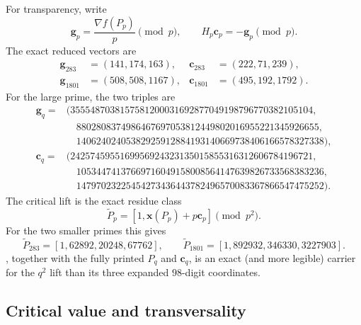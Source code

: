 For transparency, write
\[
 \mathbf g_p=\frac{\nabla f(P_p)}p\pmod p,\qquad
 H_p\mathbf c_p=-\mathbf g_p\pmod p.
\]
The exact reduced vectors are
\begin{align*}
\mathbf g_{283}&=(141,174,163),&
\mathbf c_{283}&=(222,71,239),\\
\mathbf g_{1801}&=(508,508,1167),&
\mathbf c_{1801}&=(495,192,1792).
\end{align*}
For the large prime, the two triples are
\begin{align*}
\mathbf g_q={}&\bigl(
3555487038157581200031692877049198796770382105104,\\[-2pt]
&\quad 8802808374986467697053812449802016955221345926655,\\[-2pt]
&\quad 14062402405382925912884193140669738406166578327338\bigr),\\
\mathbf c_q={}&\bigl(
2425745955169956924323135015855316312606784196721,\\[-2pt]
&\quad 10534474137669716049158008564147639826733568383236,\\[-2pt]
&\quad 14797023225454273436443782496570083367866547475252\bigr).
\end{align*}
The critical lift is the exact residue class
\begin{equation}
 \widetilde P_p=[1,\mathbf x(P_p)+p\mathbf c_p]\pmod {p^2}.
 \label{eq:critical-lift-formula}
\end{equation}
For the two smaller primes this gives
\[
 \widetilde P_{283}=[1,62892,20248,67762],\qquad
 \widetilde P_{1801}=[1,892932,346330,3227903].
\]
, together with the fully printed
$P_q$ and $\mathbf c_q$, is an exact (and more legible) carrier for the
$q^2$ lift than its three expanded $98$-digit coordinates.

\subsection{Critical value and transversality}

